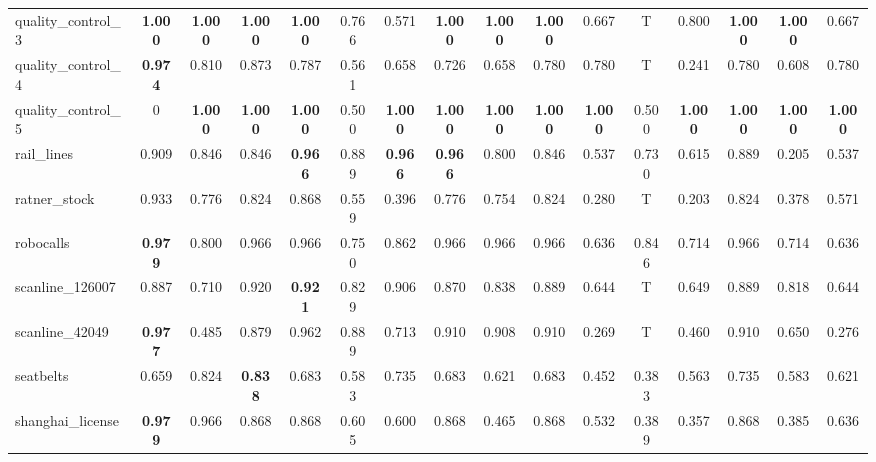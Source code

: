 \begin{table}
{\begin{tabular}{l|c|cccccccccccccc}
    quality\_control\_3 & \textbf{1.000} & \textbf{1.000} & \textbf{1.000} & \textbf{1.000} & 0.766 & 0.571 & \textbf{1.000} & \textbf{1.000} & \textbf{1.000} & 0.667 & T & 0.800 & \textbf{1.000} & \textbf{1.000} & 0.667\\
    
    quality\_control\_4 & \textbf{0.974} & 0.810 & 0.873 & 0.787 & 0.561 & 0.658 & 0.726 & 0.658 & 0.780 & 0.780 & T & 0.241 & 0.780 & 0.608 & 0.780\\
    
    \cellcolor{gray!100}quality\_control\_5 & \cellcolor{gray!100}0 & \cellcolor{gray!100}\textbf{1.000} & \cellcolor{gray!100}\textbf{1.000} & \cellcolor{gray!100}\textbf{1.000} & \cellcolor{gray!100}0.500 & \cellcolor{gray!100}\textbf{1.000} & \cellcolor{gray!100}\textbf{1.000} & \cellcolor{gray!100}\textbf{1.000} & \cellcolor{gray!100}\textbf{1.000} & \cellcolor{gray!100}\textbf{1.000} & \cellcolor{gray!100}0.500 & \cellcolor{gray!100}\textbf{1.000} & \cellcolor{gray!100}\textbf{1.000} & \cellcolor{gray!100}\textbf{1.000} & \cellcolor{gray!100}\textbf{1.000}\\
    
    rail\_lines & 0.909 & 0.846 & 0.846 & \textbf{0.966} & 0.889 & \textbf{0.966} & \textbf{0.966} & 0.800 & 0.846 & 0.537 & 0.730 & 0.615 & 0.889 & 0.205 & 0.537\\
    
    ratner\_stock & 0.933 & 0.776 & 0.824 & 0.868 & 0.559 & 0.396 & 0.776 & 0.754 & 0.824 & 0.280 & T & 0.203 & 0.824 & 0.378 & 0.571\\
    
    robocalls & \textbf{0.979} & 0.800 & 0.966 & 0.966 & 0.750 & 0.862 & 0.966 & 0.966 & 0.966 & 0.636 & 0.846 & 0.714 & 0.966 & 0.714 & 0.636\\
    
    scanline\_126007 & 0.887 & 0.710 & 0.920 & \textbf{0.921} & 0.829 & 0.906 & 0.870 & 0.838 & 0.889 & 0.644 & T & 0.649 & 0.889 & 0.818 & 0.644\\
    
    scanline\_42049 & \textbf{0.977} & 0.485 & 0.879 & 0.962 & 0.889 & 0.713 & 0.910 & 0.908 & 0.910 & 0.269 & T & 0.460 & 0.910 & 0.650 & 0.276\\
    
    seatbelts & 0.659 & 0.824 & \textbf{0.838} & 0.683 & 0.583 & 0.735 & 0.683 & 0.621 & 0.683 & 0.452 & 0.383 & 0.563 & 0.735 & 0.583 & 0.621\\
    
    shanghai\_license & \textbf{0.979} & 0.966 & 0.868 & 0.868 & 0.605 & 0.600 & 0.868 & 0.465 & 0.868 & 0.532 & 0.389 & 0.357 & 0.868 & 0.385 & 0.636\\
    

\end{tabular}}
\end{table}
